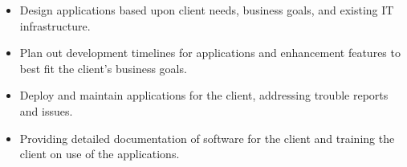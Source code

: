 \documentclass[10pt,a4paper]{altacv}
\begin{document}

\begin{fullwidth}
\makecvheader
\end{fullwidth}




\small{
\begin{itemize}
\item Design applications based upon client needs, business goals, and existing IT infrastructure.

\item Plan out development timelines for applications and enhancement features to best fit the client's business goals.

\item Deploy and maintain applications for the client, addressing trouble reports and issues.

\item Providing detailed documentation of software for the client and training the client on use of the applications.

\end{itemize}
}
\end{document}
